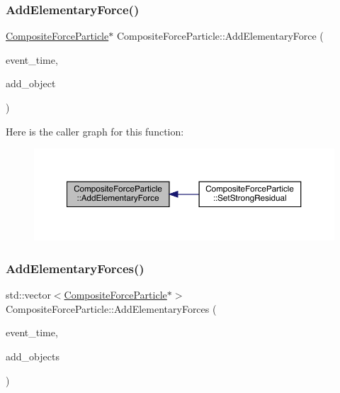\subsubsection{\texorpdfstring{Add\+Elementary\+Force()}{AddElementaryForce()}}
{\footnotesize\ttfamily \hyperlink{class_composite_force_particle}{Composite\+Force\+Particle}$\ast$ Composite\+Force\+Particle\+::\+Add\+Elementary\+Force (\begin{DoxyParamCaption}\item[{std\+::chrono\+::time\+\_\+point$<$ \hyperlink{universe_8h_a0ef8d951d1ca5ab3cfaf7ab4c7a6fd80}{Clock} $>$}]{event\+\_\+time,  }\item[{\hyperlink{class_composite_force_particle}{Composite\+Force\+Particle} $\ast$}]{add\+\_\+object }\end{DoxyParamCaption})}

Here is the caller graph for this function\+:\nopagebreak
\begin{figure}[H]
\begin{center}
\leavevmode
\includegraphics[width=350pt]{class_composite_force_particle_aed3a7ebcb98626c564dde2d54d45ff03_icgraph}
\end{center}
\end{figure}
\mbox{\label{class_composite_force_particle_ad0e97ed38272c7861d162afdf0db33c7}} 
\subsubsection{\texorpdfstring{Add\+Elementary\+Forces()}{AddElementaryForces()}}
{\footnotesize\ttfamily std\+::vector$<$\hyperlink{class_composite_force_particle}{Composite\+Force\+Particle}$\ast$$>$ Composite\+Force\+Particle\+::\+Add\+Elementary\+Forces (\begin{DoxyParamCaption}\item[{std\+::chrono\+::time\+\_\+point$<$ \hyperlink{universe_8h_a0ef8d951d1ca5ab3cfaf7ab4c7a6fd80}{Clock} $>$}]{event\+\_\+time,  }\item[{std\+::vector$<$ \hyperlink{class_composite_force_particle}{Composite\+Force\+Particle} $\ast$$>$}]{add\+\_\+objects }\end{DoxyParamCaption})}

